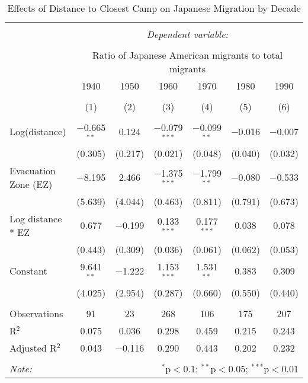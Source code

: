 
\begin{table}[!htbp] \centering 
  \caption{Effects of Distance to Closest Camp on Japanese Migration by Decade} 
  \label{ezdistreg} 
\begin{tabular}{@{\extracolsep{2pt}}lcccccc} 
\\[-1.8ex]\hline 
\hline \\[-1.8ex] 
 & \multicolumn{6}{c}{\textit{Dependent variable:}} \\ 
\cline{2-7} 
\\[-1.8ex] & \multicolumn{6}{c}{Ratio of Japanese American migrants to total migrants} \\ 
 & 1940 & 1950 & 1960 & 1970 & 1980 & 1990 \\ 
\\[-1.8ex] & (1) & (2) & (3) & (4) & (5) & (6)\\ 
\hline \\[-1.8ex] 
 Log(distance) & $-$0.665$^{**}$ & 0.124 & $-$0.079$^{***}$ & $-$0.099$^{**}$ & $-$0.016 & $-$0.007 \\ 
  & (0.305) & (0.217) & (0.021) & (0.048) & (0.040) & (0.032) \\ 
  Evacuation Zone (EZ) & $-$8.195 & 2.466 & $-$1.375$^{***}$ & $-$1.799$^{**}$ & $-$0.080 & $-$0.533 \\ 
  & (5.639) & (4.044) & (0.463) & (0.811) & (0.791) & (0.673) \\ 
  Log distance * EZ  & 0.677 & $-$0.199 & 0.133$^{***}$ & 0.177$^{***}$ & 0.038 & 0.078 \\ 
  & (0.443) & (0.309) & (0.036) & (0.061) & (0.062) & (0.053) \\ 
  Constant & 9.641$^{**}$ & $-$1.222 & 1.153$^{***}$ & 1.531$^{**}$ & 0.383 & 0.309 \\ 
  & (4.025) & (2.954) & (0.287) & (0.660) & (0.550) & (0.440) \\ 
 \hline \\[-1.8ex] 
Observations & 91 & 23 & 268 & 106 & 175 & 207 \\ 
R$^{2}$ & 0.075 & 0.036 & 0.298 & 0.459 & 0.215 & 0.243 \\ 
Adjusted R$^{2}$ & 0.043 & $-$0.116 & 0.290 & 0.443 & 0.202 & 0.232 \\ 
\hline 
\hline \\[-1.8ex] 
\textit{Note:}  


& \multicolumn{6}{r}{$^{*}$p$<$0.1; $^{**}$p$<$0.05; $^{***}$p$<$0.01} \\ 
\end{tabular} 
\end{table} 

